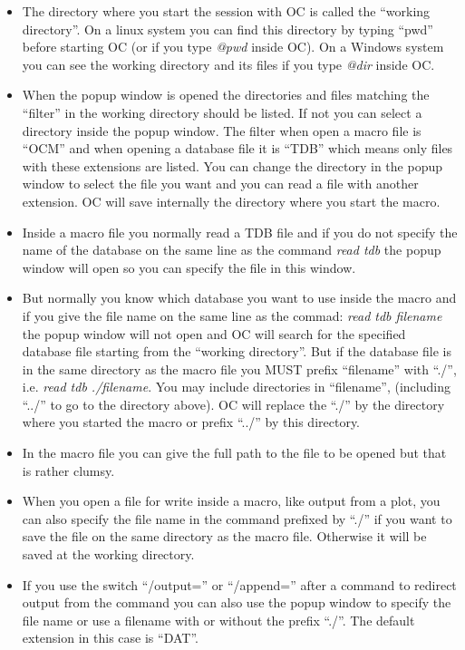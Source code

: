 \documentclass[11pt]{article}
\begin{document}
\begin{itemize}
\item The directory where you start the session with OC is called the
  ``working directory''.  On a linux system you can find this
  directory by typing ``pwd'' before starting OC (or if you type {\em
    @pwd} inside OC).  On a Windows system you can see the working
  directory and its files if you type {\em @dir} inside OC.

\item When the popup window is opened the directories and files
  matching the ``filter'' in the working directory should be listed.
  If not you can select a directory inside the popup window.  The
  filter when open a macro file is ``OCM'' and when opening a database
  file it is ``TDB'' which means only files with these extensions are
  listed.  You can change the directory in the popup window to select
  the file you want and you can read a file with another extension.
  OC will save internally the directory where you start the macro.
  
\item Inside a macro file you normally read a TDB file and if you do
  not specify the name of the database on the same line as the command
  {\em read tdb} the popup window will open so you can specify the
  file in this window.

\item But normally you know which database you want to use inside the
  macro and if you give the file name on the same line as the commad:
  {\em read tdb filename} the popup window will not open and OC will
  search for the specified database file starting from the ``working
  directory''.  But if the database file is in the same directory as
  the macro file you MUST prefix ``filename'' with ``./'', i.e. {\em
    read tdb ./filename}.  You may include directories in
  ``filename'', (including ``../'' to go to the directory above).  OC
  will replace the ``./'' by the directory where you started the macro
  or prefix ``../'' by this directory.

\item In the macro file you can give the full path to the file to be
  opened but that is rather clumsy.

\item When you open a file for write inside a macro, like output from
  a plot, you can also specify the file name in the command prefixed
  by ``./'' if you want to save the file on the same directory as the
  macro file.  Otherwise it will be saved at the working directory.

\item If you use the switch ``/output='' or ``/append='' after a
  command to redirect output from the command you can also use the
  popup window to specify the file name or use a filename with or
  without the prefix ``./''.  The default extension in this case is ``DAT''.

\end{itemize}
\end{document}
